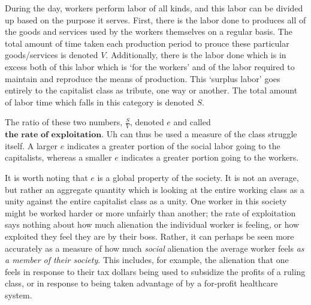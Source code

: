 \documentclass{article}
\begin{document}
During the day, workers perform labor of all kinds, and this labor can be divided up based on the purpose it serves. First, there is the labor done to produces all of the goods and services used by the workers themselves on a regular basis. The total amount of time taken each production period to prouce these particular goods/services is denoted $V$. Additionally, there is the labor done which is in excess both of this labor which is `for the workers' and of the labor required to maintain and reproduce the means of production. This `surplus labor' goes entirely to the capitalist class as tribute, one way or another. The total amount of labor time which falls in this category is denoted $S$. \\ \par The ratio of these two numbers, $\frac{S}{V}$, denoted $e$ and called $\textbf{the rate of exploitation}$. Uh can thus be used a measure of the class struggle itself. A larger $e$ indicates a greater portion of the social labor going to the capitalists, whereas a smaller $e$ indicates a greater portion going to the workers. \\ \par It is worth noting that $e$ is a global property of the society. It is not an average, but rather an aggregate quantity which is looking at the entire working class as a unity against the entire capitalist class as a unity. One worker in this society might be worked harder or more unfairly than another; the rate of exploitation says nothing about how much alienation the individual worker is feeling, or how exploited they feel they are by their boss. Rather, it can perhaps be seen more accurately as a measure of how much \textit{social} alienation the average worker feels \textit{as a member of their society}. This includes, for example, the alienation that one feels in response to their tax dollars being used to subsidize the profits of a ruling class, or in response to being taken advantage of by a for-profit healthcare system.
\end{document}
